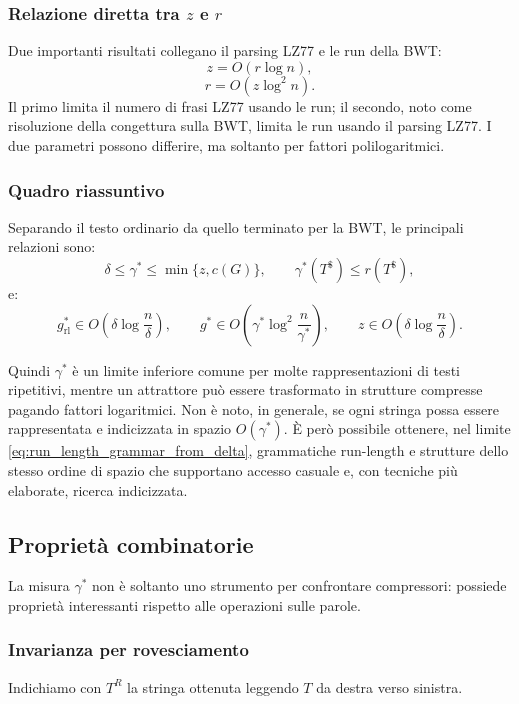 \documentclass{article}
\theoremstyle{definition}
\numberwithin{equation}{section}
\begin{document}
\subsubsection{Relazione diretta tra \texorpdfstring{$z$}{z} e
    \texorpdfstring{$r$}{r}}
Due importanti risultati collegano il parsing LZ77 e le run della BWT:
\begin{equation}\label{eq:z_from_r}
    z=O(r\log n),
\end{equation}
\begin{equation}\label{eq:r_from_z}
    r=O(z\log^2 n).
\end{equation}
Il primo limita il numero di frasi LZ77 usando le run; il secondo, noto come
risoluzione della congettura sulla BWT, limita le run usando il parsing LZ77.
I due parametri possono differire, ma soltanto per fattori polilogaritmici.

\subsubsection{Quadro riassuntivo}
Separando il testo ordinario da quello terminato per la BWT, le principali
relazioni sono:
\[
    \delta
    \leq
    \gamma^*
    \leq
    \min\{z,c(G)\},
    \qquad
    \gamma^*(T^\$)\leq r(T^\$),
\]
e:
\[
    g^*_{\mathrm{rl}}
    \in
    O\left(
    \delta
    \log\frac{n}{\delta}
    \right),
    \qquad
    g^*
    \in
    O\left(
    \gamma^*
    \log^2\frac{n}{\gamma^*}
    \right),
    \qquad
    z
    \in
    O\left(
    \delta
    \log\frac{n}{\delta}
    \right).
\]

Quindi $\gamma^*$ è un limite inferiore comune per molte rappresentazioni di
testi ripetitivi, mentre un attrattore può essere trasformato in strutture
compresse pagando fattori logaritmici. Non è noto, in generale, se ogni stringa
possa essere rappresentata e indicizzata in spazio $O(\gamma^*)$. È però
possibile ottenere, nel limite
\eqref{eq:run_length_grammar_from_delta}, grammatiche run-length e strutture
dello stesso ordine di spazio che supportano accesso casuale e, con tecniche
più elaborate, ricerca indicizzata.

\subsection{Proprietà combinatorie}
La misura $\gamma^*$ non è soltanto uno strumento per confrontare compressori:
possiede proprietà interessanti rispetto alle operazioni sulle parole.

\subsubsection{Invarianza per rovesciamento}
Indichiamo con $T^R$ la stringa ottenuta leggendo $T$ da destra verso sinistra.
\end{document}
